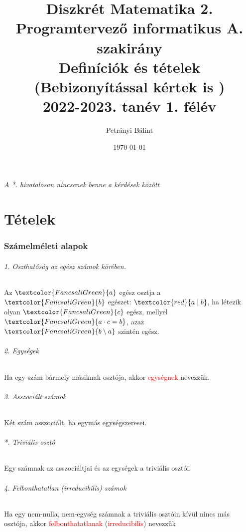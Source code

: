 \documentclass[10pt,a4paper]{article}
\date{\today}
\author{Petrányi Bálint}
\title{%
	\textbf{Diszkrét Matematika 2.} \\
	\textbf{Programtervező informatikus A. szakirány} \\
	Definíciók és tételek (Bebizonyítással kértek is )\\
	\large 2022-2023. tanév 1. félév
}
\renewcommand{\>}{\rightarrow}
\newcommand{\red}[1]{\textcolor{red}{#1}}
\newcommand{\gr}[1]{\textcolor{FancsaliGreen}{#1}}
\newenvironment{m}
    {\begin{center}
    \begin{mdframed}[backgroundcolor=FancsaliBlue]
    }
    { 
    \end{mdframed}
    \end{center}
    }
\begin{document}
\maketitle
\tableofcontents
\newpage
\textit{A *. hivatalosan nincsenek benne a kérdések között}
\part{Tételek}

\section{Számelméleti alapok}

\paragraph{1. Oszthatóság az egész számok körében.}
\begin{m}
Az $\gr{a}$ egész osztja a $\gr{b}$ egészet: $\red{a \;\lvert\; b}$, ha létezik olyan $\gr{c}$ egész, mellyel $\gr{a\cdot c = b}$, azaz $\gr{b\setminus a}$ szintén egész.
\end{m}

\paragraph{2. Egységek}
\begin{m}
Ha egy szám bármely másiknak osztója, akkor \red{egységnek} nevezzük.
\end{m}

\paragraph{3. Asszociált számok}
\begin{m}
Két szám asszociált, ha egymás egységszeresei.
\end{m}
\paragraph{*. Triviális osztó}
\begin{m}
Egy számnak az asszociáltjai és az egységek a triviális osztói.
\end{m}
\paragraph{4. Felbonthatatlan (irreducibilis) számok}
\begin{m}
Ha egy nem-nulla, nem-egység számnak a triviális osztóin kívül nincs más osztója, akkor \red{felbonthatatlanak}  (\red{irreducibilis}) nevezzük 
\end{m}
\end{document}
